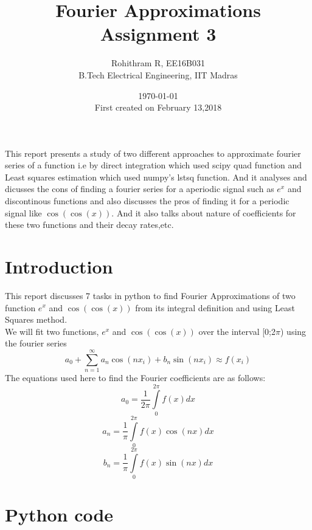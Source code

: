 \documentclass[a4paper]{article}
\title{Fourier Approximations \\ Assignment 3}
\author{Rohithram R, EE16B031 \\ B.Tech Electrical Engineering, IIT Madras}
\date{\today \\ First created on February 13,2018}
\begin{document}
    
    
    \maketitle
    
    
 \begin{abstract}    
	\end{abstract}
	This report presents a study of two different approaches to approximate fourier series of a function i.e by direct integration which used scipy quad function and Least squares estimation which used numpy's lstsq function.
	And it analyses and dicusses the cons of finding a fourier series for a aperiodic signal such as $e^{x}$ and discontinous functions  and 
	also discusses the pros of finding it for a periodic signal like $\cos(\cos(x))$. And it also talks about nature of coefficients for these two functions and their decay rates,etc.
		
	\section{Introduction}
	This report discusses 7 tasks in python to find Fourier Approximations of two function $e^{x}$ and $\cos(\cos(x))$ from its integral definition and using Least Squares method.\\
	We will fit two functions, $e^{x}$ and $\cos(\cos(x))$ over the interval [0;2$\pi$) using the fourier series
 	\begin{equation}
    a_{0} + \sum\limits_{n=1}^{\infty} {{a_{n}\cos(nx_{i})+b_{n}\sin(nx_{i})}} \approx f(x_{i}) 
    \end{equation}
    	The equations used here to find the Fourier coefficients are as follows:
    \begin{equation}
         a_{0} = \frac{1}{2\pi}\int\limits_{0}^{2\pi} f(x)dx 
    \end{equation}
    \begin{equation}
         a_{n} = \frac{1}{\pi}\int\limits_{0}^{2\pi} f(x)\cos(nx)dx 
    \end{equation}
    \begin{equation}
         b_{n} = \frac{1}{\pi}\int\limits_{0}^{2\pi} f(x)\sin(nx)dx 
    \end{equation}
	
    \section{Python code}   
    
\end{document}
